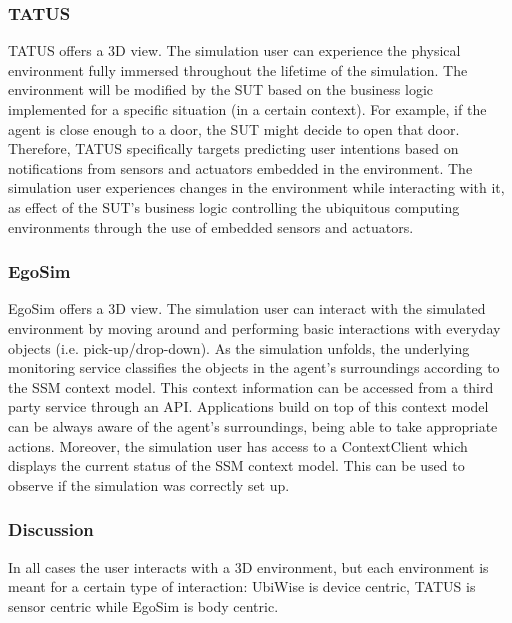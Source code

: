 \subsubsection{TATUS} %
TATUS offers a 3D view. The simulation user can experience the physical environment fully immersed throughout the lifetime of the simulation. The environment will be modified by the SUT based on the business logic implemented for a specific situation (in a certain context). For example, if the agent is close enough to a door, the SUT might decide to open that door. Therefore, TATUS specifically targets predicting user intentions based on notifications from sensors and actuators embedded in the environment. The simulation user experiences changes in the environment while interacting with it, as effect of the SUT's business logic controlling the ubiquitous computing environments through the use of embedded sensors and actuators.\\

\subsubsection{EgoSim} %
EgoSim offers a 3D view. The simulation user can interact with the simulated environment by moving around and performing basic interactions with everyday objects (i.e. pick-up/drop-down). As the simulation unfolds, the underlying monitoring service classifies the objects in the agent's surroundings according to the SSM context model. This context information can be accessed from a third party service through an API. Applications build on top of this context model can be always aware of the agent's surroundings, being able to take appropriate actions. Moreover, the simulation user has access to a ContextClient which displays the current status of the SSM context model. This can be used to observe if the simulation was correctly set up.\\

\subsubsection{Discussion} %
In all cases the user interacts with a 3D environment, but each environment is meant for a certain type of interaction: UbiWise is device centric, TATUS is sensor centric while EgoSim is body centric.

